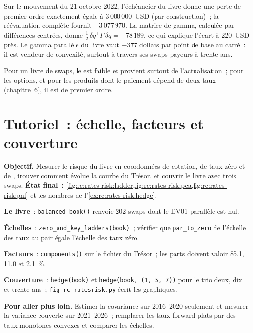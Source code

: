 \begin{example}\label{ex:rc:rates-risk:gamma}
Sur le mouvement du 21 octobre 2022, l'échéancier du livre donne une perte de
premier ordre exactement égale à 3\,000\,000~USD (par construction)~; la réévaluation complète fournit
$-3\,077\,970$. La matrice de gamma, calculée par différences centrées, donne
$\tfrac12\,\delta q^\top\Gamma\,\delta q = -78\,189$, ce qui explique l'écart
à 220~USD près. Le gamma parallèle du livre vaut $-377$ dollars par
point de base au carré~: il est vendeur de convexité, surtout à travers ses
swaps payeurs à trente ans.
\end{example}

Pour un livre de swaps, le  est faible et provient surtout de
l'actualisation~; pour les options, et pour les produits dont le paiement dépend
de deux taux (chapitre~6), il est de premier ordre.

\section{Tutoriel~: échelle, facteurs et couverture}\label{tut:rc:rates-risk:tutorial}

\begin{tutorial}
\textbf{Objectif.} Mesurer le risque du livre en coordonnées de cotation, de taux
zéro et de , trouver comment évolue la courbe du Trésor, et
couvrir le livre avec trois swaps. \textbf{État final~:}
\cref{fig:rc:rates-risk:ladder,fig:rc:rates-risk:pca,fig:rc:rates-risk:pnl} et les
nombres de l'\cref{ex:rc:rates-risk:hedge}.
\begin{tutsteps}
\item \textbf{Le livre}~: \texttt{balanced\_book()} renvoie 202 swaps dont le DV01
parallèle est nul.
\item \textbf{Échelles}~: \texttt{zero\_and\_key\_ladders(book)}~; vérifier que
\texttt{par\_to\_zero} de l'échelle des taux au pair égale l'échelle des taux zéro.
\label{lst:rc:rates-risk:ladder}
\item \textbf{Facteurs}~: \texttt{components()} sur le fichier du Trésor~; les parts
doivent valoir 85.1, 11.0 et 2.1~\%.
\item \textbf{Couverture}~: \texttt{hedge(book)} et \texttt{hedge(book, (1, 5, 7))}
pour le trio deux, dix et trente ans~; \texttt{fig\_rc\_ratesrisk.py} écrit
les graphiques.
\end{tutsteps}
\textbf{Pour aller plus loin.} Estimer la covariance sur 2016--2020 seulement et
mesurer la variance couverte sur 2021--2026~; remplacer les taux forward plats par
des taux monotones convexes et comparer les échelles.
\end{tutorial}

